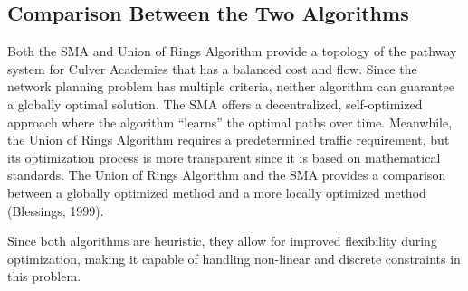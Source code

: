 \documentclass[11pt]{article}
\begin{document}
\subsection{Comparison Between the Two Algorithms}
Both the SMA and Union of Rings Algorithm provide a topology of the pathway system for Culver Academies that has a balanced cost and flow. Since the network planning problem has multiple criteria, neither algorithm can guarantee a globally optimal solution. The SMA offers a decentralized, self-optimized approach where the algorithm “learns” the optimal paths over time. Meanwhile, the Union of Rings Algorithm requires a predetermined traffic requirement, but its optimization process is more transparent since it is based on mathematical standards. The Union of Rings Algorithm and the SMA provides a comparison between a globally optimized method and a more locally optimized method (Blessings, 1999). \par
	Since both algorithms are heuristic, they allow for improved flexibility during optimization, making it capable of handling non-linear and discrete constraints in this problem. 
\end{document}
